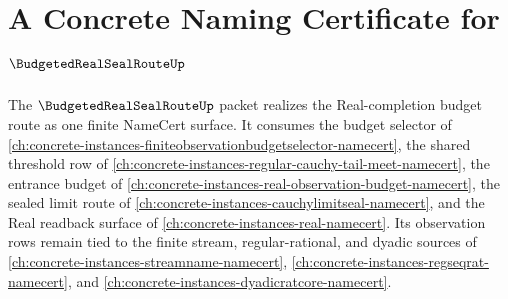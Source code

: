 \chapter{A Concrete Naming Certificate for $\BudgetedRealSealRouteUp$}
\label{ch:concrete-instances-budgeted-real-seal-route-namecert}

The $\BudgetedRealSealRouteUp$ packet realizes the Real-completion budget route as one finite NameCert surface. It consumes the budget selector of \autoref{ch:concrete-instances-finiteobservationbudgetselector-namecert}, the shared threshold row of \autoref{ch:concrete-instances-regular-cauchy-tail-meet-namecert}, the entrance budget of \autoref{ch:concrete-instances-real-observation-budget-namecert}, the sealed limit route of \autoref{ch:concrete-instances-cauchylimitseal-namecert}, and the Real readback surface of \autoref{ch:concrete-instances-real-namecert}. Its observation rows remain tied to the finite stream, regular-rational, and dyadic sources of \autoref{ch:concrete-instances-streamname-namecert}, \autoref{ch:concrete-instances-regseqrat-namecert}, and \autoref{ch:concrete-instances-dyadicratcore-namecert}.

